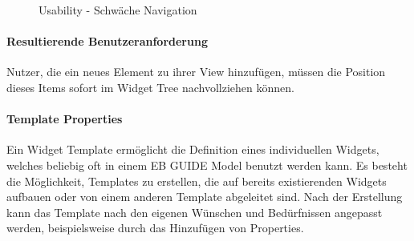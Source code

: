 \begin{figure}[H]
  \centering
  \qquad
  \caption{Usability - Schwäche Navigation}%
  \label{fig:Navigation}
\end{figure}

\paragraph{Resultierende Benutzeranforderung}
Nutzer, die ein neues Element zu ihrer View hinzufügen, müssen die Position dieses Items sofort im Widget Tree nachvollziehen können.

\paragraph{Template Properties}
Ein Widget Template ermöglicht die Definition eines individuellen Widgets, welches beliebig oft in einem EB GUIDE Model benutzt werden kann.
Es besteht die Möglichkeit, Templates zu erstellen, die auf bereits existierenden Widgets aufbauen oder von einem anderen Template abgeleitet sind.
Nach der Erstellung kann das Template nach den eigenen Wünschen und Bedürfnissen angepasst werden, beispielsweise durch das Hinzufügen von Properties.

